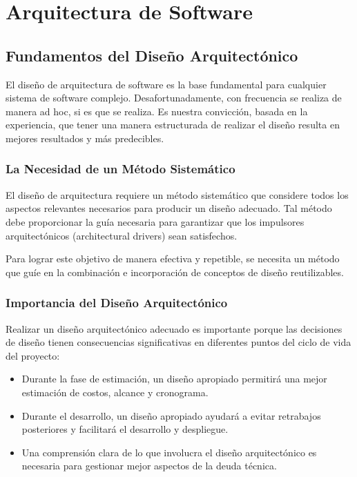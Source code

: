 
\chapter{Arquitectura de Software}


\section{Fundamentos del Diseño Arquitectónico}

El diseño de arquitectura de software es la base fundamental para cualquier sistema de software complejo. Desafortunadamente, con frecuencia se realiza de manera ad hoc, si es que se realiza. Es nuestra convicción, basada en la experiencia, que tener una manera estructurada de realizar el diseño resulta en mejores resultados y más predecibles.

\subsection{La Necesidad de un Método Sistemático}

El diseño de arquitectura requiere un método sistemático que considere todos los aspectos relevantes necesarios para producir un diseño adecuado. Tal método debe proporcionar la guía necesaria para garantizar que los impulsores arquitectónicos (architectural drivers) sean satisfechos.

Para lograr este objetivo de manera efectiva y repetible, se necesita un método que guíe en la combinación e incorporación de conceptos de diseño reutilizables.

\subsection{Importancia del Diseño Arquitectónico}

Realizar un diseño arquitectónico adecuado es importante porque las decisiones de diseño tienen consecuencias significativas en diferentes puntos del ciclo de vida del proyecto:

\begin{itemize}
    \item Durante la fase de estimación, un diseño apropiado permitirá una mejor estimación de costos, alcance y cronograma.
    \item Durante el desarrollo, un diseño apropiado ayudará a evitar retrabajos posteriores y facilitará el desarrollo y despliegue.
    \item Una comprensión clara de lo que involucra el diseño arquitectónico es necesaria para gestionar mejor aspectos de la deuda técnica.
\end{itemize}


